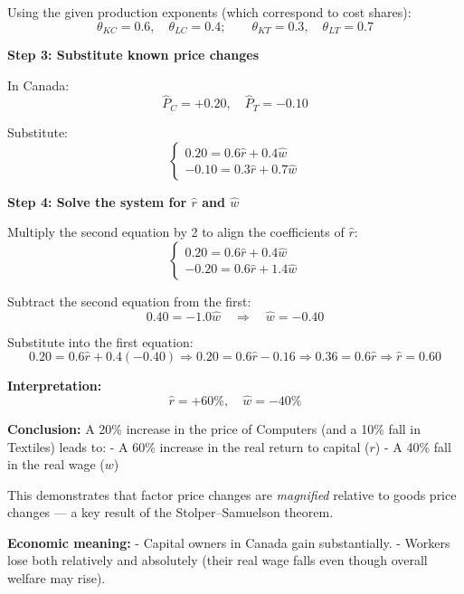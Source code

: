 \documentclass[12pt]{article}
\begin{document}
Using the given production exponents (which correspond to cost shares):
\[
\theta_{KC} = 0.6, \quad \theta_{LC} = 0.4; \qquad
\theta_{KT} = 0.3, \quad \theta_{LT} = 0.7
\]

\textbf{Step 3: Substitute known price changes}

In Canada:
\[
\hat{P}_C = +0.20, \quad \hat{P}_T = -0.10
\]

Substitute:
\[
\begin{cases}
0.20 = 0.6\hat{r} + 0.4\hat{w} \\
-0.10 = 0.3\hat{r} + 0.7\hat{w}
\end{cases}
\]

\textbf{Step 4: Solve the system for \(\hat{r}\) and \(\hat{w}\)}

Multiply the second equation by 2 to align the coefficients of \(\hat{r}\):
\[
\begin{cases}
0.20 = 0.6\hat{r} + 0.4\hat{w} \\
-0.20 = 0.6\hat{r} + 1.4\hat{w}
\end{cases}
\]

Subtract the second equation from the first:
\[
0.40 = -1.0\hat{w} \quad \Rightarrow \quad \hat{w} = -0.40
\]

Substitute into the first equation:
\[
0.20 = 0.6\hat{r} + 0.4(-0.40)
\Rightarrow 0.20 = 0.6\hat{r} - 0.16
\Rightarrow 0.36 = 0.6\hat{r}
\Rightarrow \hat{r} = 0.60
\]

\textbf{Interpretation:}
\[
\boxed{\hat{r} = +60\%, \quad \hat{w} = -40\%}
\]

\textbf{Conclusion:}  
A 20\% increase in the price of Computers (and a 10\% fall in Textiles) leads to:
- A 60\% increase in the real return to capital (\(r\))
- A 40\% fall in the real wage (\(w\))

This demonstrates that factor price changes are \emph{magnified} relative to goods price changes — a key result of the Stolper–Samuelson theorem.

\textbf{Economic meaning:}
- Capital owners in Canada gain substantially.
- Workers lose both relatively and absolutely (their real wage falls even though overall welfare may rise).
\end{document}
